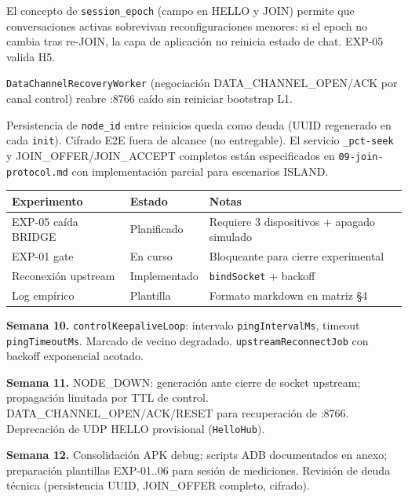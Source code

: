 El concepto de \texttt{session\_epoch} (campo en HELLO y JOIN) permite que conversaciones activas sobrevivan reconfiguraciones menores: si el epoch no cambia tras re-JOIN, la capa de aplicación no reinicia estado de chat. EXP-05 valida H5.

\texttt{DataChannelRecoveryWorker} (negociación DATA\_CHANNEL\_OPEN/ACK por canal control) reabre :8766 caído sin reiniciar bootstrap L1.


Persistencia de \texttt{node\_id} entre reinicios queda como deuda (UUID regenerado en cada \texttt{init}). Cifrado E2E fuera de alcance (no entregable). El servicio \texttt{\_pct-seek} y JOIN\_OFFER/JOIN\_ACCEPT completos están especificados en \texttt{09-join-protocol.md} con implementación parcial para escenarios ISLAND.


\begin{center}
\small
\begin{tabular}{@{}p{2.8cm}p{2cm}p{7.2cm}@{}}
\hline
\textbf{Experimento} & \textbf{Estado} & \textbf{Notas} \\
\hline
EXP-05 caída BRIDGE & Planificado & Requiere 3 dispositivos + apagado simulado \\
EXP-01 gate & En curso & Bloqueante para cierre experimental \\
Reconexión upstream & Implementado & \texttt{bindSocket} + backoff \\
Log empírico & Plantilla & Formato markdown en matriz §4 \\
\hline
\end{tabular}
\end{center}


\textbf{Semana 10.} \texttt{controlKeepaliveLoop}: intervalo \texttt{pingIntervalMs}, timeout \texttt{pingTimeoutMs}. Marcado de vecino degradado. \texttt{upstreamReconnectJob} con backoff exponencial acotado.

\textbf{Semana 11.} NODE\_DOWN: generación ante cierre de socket upstream; propagación limitada por TTL de control. DATA\_CHANNEL\_OPEN/ACK/RESET para recuperación de :8766. Deprecación de UDP HELLO provisional (\texttt{HelloHub}).

\textbf{Semana 12.} Consolidación APK debug; scripts ADB documentados en anexo; preparación plantillas EXP-01..06 para sesión de mediciones. Revisión de deuda técnica (persistencia UUID, JOIN\_OFFER completo, cifrado).

